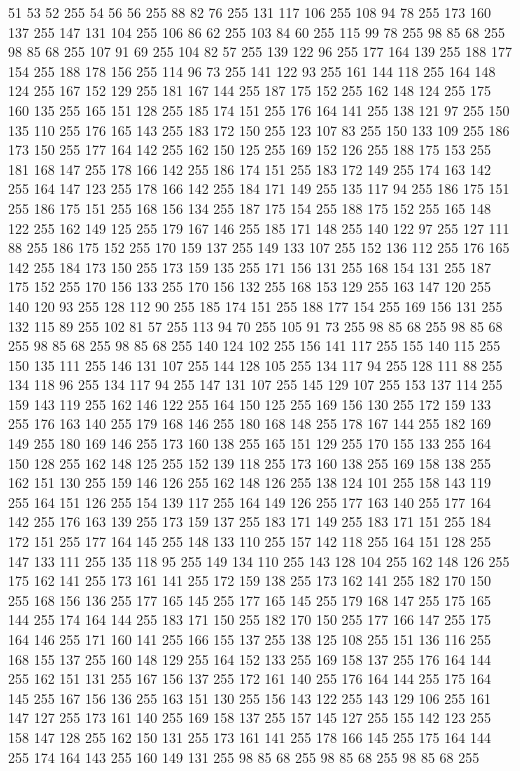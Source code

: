 51 53 52 255 54 56 56 255 88 82 76 255 131 117 106 255 108 94 78 255 173 160 137 255 147 131 104 255 106 86 62 255 103 84 60 255 115 99 78 255 98 85 68 255 98 85 68 255 107 91 69 255 104 82 57 255 139 122 96 255 177 164 139 255 188 177 154 255 188 178 156 255 114 96 73 255 141 122 93 255 161 144 118 255 164 148 124 255 167 152 129 255 181 167 144 255 187 175 152 255 162 148 124 255 175 160 135 255 165 151 128 255 185 174 151 255 176 164 141 255 138 121 97 255 150 135 110 255 176 165 143 255 183 172 150 255 123 107 83 255 150 133 109 255 186 173 150 255 177 164 142 255 162 150 125 255 169 152 126 255 188 175 153 255 181 168 147 255 178 166 142 255 186 174 151 255 183 172 149 255 174 163 142 255 164 147 123 255 178 166 142 255 184 171 149 255 135 117 94 255 186 175 151 255 186 175 151 255 168 156 134 255 187 175 154 255 188 175 152 255 165 148 122 255 162 149 125 255 179 167 146 255 185 171 148 255 140 122 97 255 127 111 88 255 186 175 152 255 170 159 137 255 149 133 107 255
152 136 112 255 176 165 142 255 184 173 150 255 173 159 135 255 171 156 131 255 168 154 131 255 187 175 152 255 170 156 133 255 170 156 132 255 168 153 129 255 163 147 120 255 140 120 93 255 128 112 90 255 185 174 151 255 188 177 154 255 169 156 131 255 132 115 89 255 102 81 57 255 113 94 70 255 105 91 73 255 98 85 68 255 98 85 68 255 98 85 68 255 98 85 68 255 140 124 102 255 156 141 117 255 155 140 115 255 150 135 111 255 146 131 107 255 144 128 105 255 134 117 94 255 128 111 88 255 134 118 96 255 134 117 94 255 147 131 107 255 145 129 107 255 153 137 114 255 159 143 119 255 162 146 122 255 164 150 125 255 169 156 130 255 172 159 133 255 176 163 140 255 179 168 146 255 180 168 148 255 178 167 144 255 182 169 149 255 180 169 146 255 173 160 138 255 165 151 129 255 170 155 133 255 164 150 128 255 162 148 125 255 152 139 118 255 173 160 138 255 169 158 138 255 162 151 130 255 159 146 126 255 162 148 126 255 138 124 101 255 158 143 119 255 164 151 126 255 154 139 117 255 164 149 126 255
177 163 140 255 177 164 142 255 176 163 139 255 173 159 137 255 183 171 149 255 183 171 151 255 184 172 151 255 177 164 145 255 148 133 110 255 157 142 118 255 164 151 128 255 147 133 111 255 135 118 95 255 149 134 110 255 143 128 104 255 162 148 126 255 175 162 141 255 173 161 141 255 172 159 138 255 173 162 141 255 182 170 150 255 168 156 136 255 177 165 145 255 177 165 145 255 179 168 147 255 175 165 144 255 174 164 144 255 183 171 150 255 182 170 150 255 177 166 147 255 175 164 146 255 171 160 141 255 166 155 137 255 138 125 108 255 151 136 116 255 168 155 137 255 160 148 129 255 164 152 133 255 169 158 137 255 176 164 144 255 162 151 131 255 167 156 137 255 172 161 140 255 176 164 144 255 175 164 145 255 167 156 136 255 163 151 130 255 156 143 122 255 143 129 106 255 161 147 127 255 173 161 140 255 169 158 137 255 157 145 127 255 155 142 123 255 158 147 128 255 162 150 131 255 173 161 141 255 178 166 145 255 175 164 144 255 174 164 143 255 160 149 131 255 98 85 68 255 98 85 68 255 98 85 68 255
